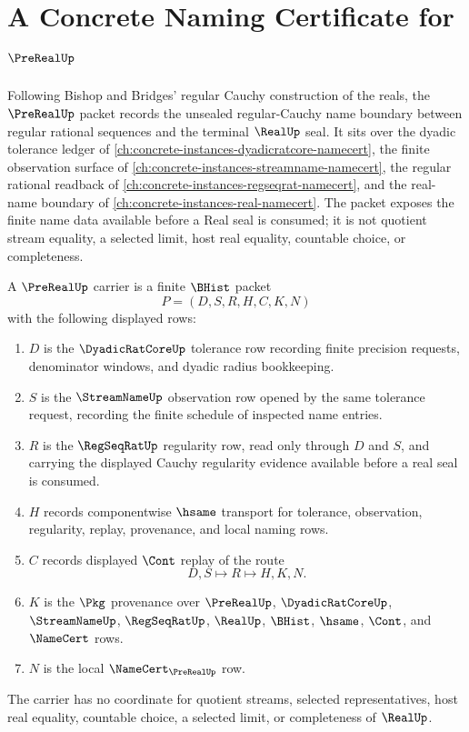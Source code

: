 \chapter{A Concrete Naming Certificate for $\PreRealUp$}
\label{ch:concrete-instances-pre-real-namecert}

Following Bishop and Bridges' regular Cauchy construction of the reals, the
$\PreRealUp$ packet records the unsealed regular-Cauchy name boundary between
regular rational sequences and the terminal $\RealUp$ seal. It sits over the
dyadic tolerance ledger of
\autoref{ch:concrete-instances-dyadicratcore-namecert}, the finite observation
surface of \autoref{ch:concrete-instances-streamname-namecert}, the regular
rational readback of \autoref{ch:concrete-instances-regseqrat-namecert}, and
the real-name boundary of \autoref{ch:concrete-instances-real-namecert}. The
packet exposes the finite name data available before a Real seal is consumed;
it is not quotient stream equality, a selected limit, host real equality,
countable choice, or completeness.

\begin{definition}
\label{def:pre-real-carrier}
A $\PreRealUp$ carrier is a finite $\BHist$ packet
$$
P=(D,S,R,H,C,K,N)
$$
with the following displayed rows:
\begin{enumerate}
\item $D$ is the $\DyadicRatCoreUp$ tolerance row recording finite precision
requests, denominator windows, and dyadic radius bookkeeping.
\item $S$ is the $\StreamNameUp$ observation row opened by the same tolerance
request, recording the finite schedule of inspected name entries.
\item $R$ is the $\RegSeqRatUp$ regularity row, read only through $D$ and $S$,
and carrying the displayed Cauchy regularity evidence available before a real
seal is consumed.
\item $H$ records componentwise $\hsame$ transport for tolerance, observation,
regularity, replay, provenance, and local naming rows.
\item $C$ records displayed $\Cont$ replay of the route
$$
D,S \longmapsto R \longmapsto H,K,N .
$$
\item $K$ is the $\Pkg$ provenance over $\PreRealUp$, $\DyadicRatCoreUp$,
$\StreamNameUp$, $\RegSeqRatUp$, $\RealUp$, $\BHist$, $\hsame$, $\Cont$, and
$\NameCert$ rows.
\item $N$ is the local $\NameCert_{\PreRealUp}$ row.
\end{enumerate}
The carrier has no coordinate for quotient streams, selected representatives,
host real equality, countable choice, a selected limit, or completeness of
$\RealUp$.
\end{definition}

